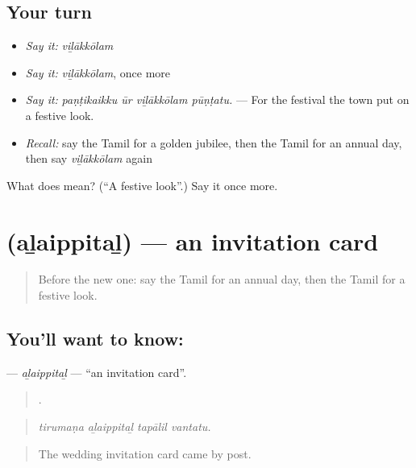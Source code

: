 \subsection*{Your turn}
\begin{itemize}
\raggedright
  \item \emph{Say it:} \emph{viḻākkōlam}
  \item \emph{Say it:} \emph{viḻākkōlam}, once more
  \item \emph{Say it:} \emph{paṇṭikaikku ūr viḻākkōlam pūṇṭatu.} — For the festival the town put on a festive look.
  \item \emph{Recall:} say the Tamil for a golden jubilee, then the Tamil for an annual day, then say \emph{viḻākkōlam} again
\end{itemize}

\begin{tcolorbox}[breakable,colback=teal!4,colframe=teal!35!black,title={Before you move on}]
What does  mean? (\textquotedblleft{}A festive look\textquotedblright{}.) Say it once more.
\end{tcolorbox}
\section[\texorpdfstring{\ta{அழைப்பிதழ்} (aḻaippitaḻ)}{அழைப்பிதழ் (aḻaippitaḻ)}]{ (aḻaippitaḻ) — an invitation card}

\label{lesson:TA-C319-alaippital}



\begin{quote}
Before the new one: say the Tamil for an annual day, then the Tamil for a festive look.
\end{quote}

\subsection*{You'll want to know: }
\textbf{} — \emph{aḻaippitaḻ} — \textquotedblleft{}an invitation card\textquotedblright{}.

\begin{quote}
   .
\end{quote}

\begin{quote}
\emph{tirumaṇa aḻaippitaḻ tapālil vantatu.}
\end{quote}

\begin{quote}
The wedding invitation card came by post.
\end{quote}

